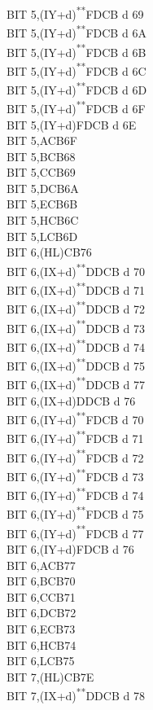 \documentclass[12pt,twoside,openright,a4paper]{book}
\newcommand{\UNDOC}{\textnormal{\textsuperscript{**}}}
\begin{document}
\begin{multicols}{3}
{\begin{tabbing}
	BIT 5,(IY+d)\UNDOC\>FDCB d 69\\
	BIT 5,(IY+d)\UNDOC\>FDCB d 6A\\
	BIT 5,(IY+d)\UNDOC\>FDCB d 6B\\
	BIT 5,(IY+d)\UNDOC\>FDCB d 6C\\
	BIT 5,(IY+d)\UNDOC\>FDCB d 6D\\
	BIT 5,(IY+d)\UNDOC\>FDCB d 6F\\
	BIT 5,(IY+d)\>FDCB d 6E\\
	BIT 5,A\>CB6F\\
	BIT 5,B\>CB68\\
	BIT 5,C\>CB69\\
	BIT 5,D\>CB6A\\
	BIT 5,E\>CB6B\\
	BIT 5,H\>CB6C\\
	BIT 5,L\>CB6D\\
	BIT 6,(HL)\>CB76\\
	BIT 6,(IX+d)\UNDOC\>DDCB d 70\\
	BIT 6,(IX+d)\UNDOC\>DDCB d 71\\
	BIT 6,(IX+d)\UNDOC\>DDCB d 72\\
	BIT 6,(IX+d)\UNDOC\>DDCB d 73\\
	BIT 6,(IX+d)\UNDOC\>DDCB d 74\\
	BIT 6,(IX+d)\UNDOC\>DDCB d 75\\
	BIT 6,(IX+d)\UNDOC\>DDCB d 77\\
	BIT 6,(IX+d)\>DDCB d 76\\
	BIT 6,(IY+d)\UNDOC\>FDCB d 70\\
	BIT 6,(IY+d)\UNDOC\>FDCB d 71\\
	BIT 6,(IY+d)\UNDOC\>FDCB d 72\\
	BIT 6,(IY+d)\UNDOC\>FDCB d 73\\
	BIT 6,(IY+d)\UNDOC\>FDCB d 74\\
	BIT 6,(IY+d)\UNDOC\>FDCB d 75\\
	BIT 6,(IY+d)\UNDOC\>FDCB d 77\\
	BIT 6,(IY+d)\>FDCB d 76\\
	BIT 6,A\>CB77\\
	BIT 6,B\>CB70\\
	BIT 6,C\>CB71\\
	BIT 6,D\>CB72\\
	BIT 6,E\>CB73\\
	BIT 6,H\>CB74\\
	BIT 6,L\>CB75\\
	BIT 7,(HL)\>CB7E\\
	BIT 7,(IX+d)\UNDOC\>DDCB d 78\\

\end{tabbing}}
\end{multicols}
\end{document}
